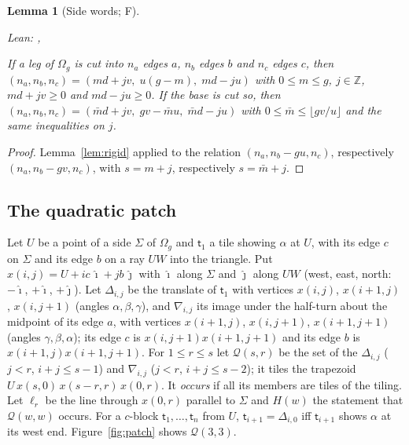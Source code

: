 \documentclass[11pt,reqno]{amsart}
\theoremstyle{plain}
\newtheorem{lemma}[theorem]{Lemma}
\theoremstyle{definition}
\newcommand{\Z}{\mathbb{Z}}
\newcommand{\sF}{\textup{\textsf{F}}}
\begin{document}
\begin{lemma}[Side words; \sF]\label{lem:words}
{\small\noindent\emph{Lean:} , \par}
If a leg of $\Omega_{g}$ is cut into $n_a$ edges $a$, $n_b$ edges $b$ and $n_c$ edges $c$, then $(n_a,n_b,n_c)=(md+jv,\;u(g-m),\;md-ju)$ with $0\le m\le g$, $j\in\Z$, $md+jv\ge0$ and $md-ju\ge0$. If the base is cut so, then $(n_a,n_b,n_c)=(\bar md+jv,\;gv-\bar mu,\;\bar md-ju)$ with $0\le\bar m\le\lfloor gv/u\rfloor$ and the same inequalities on $j$.
\end{lemma}
\begin{proof}
Lemma~\ref{lem:rigid} applied to the relation $(n_a,n_b-gu,n_c)$, respectively $(n_a,n_b-gv,n_c)$, with $s=m+j$, respectively $s=\bar m+j$.
\end{proof}

\subsection{The quadratic patch}\label{sub:patch}
Let $U$ be a point of a side $\Sigma$ of $\Omega_{g}$ and $\mathsf t_1$ a tile showing $\alpha$ at $U$, with its edge $c$ on $\Sigma$ and its edge $b$ on a ray $UW$ into the triangle. Put $x(i,j)=U+ic\,\hat\imath+jb\,\hat\jmath$ with $\hat\imath$ along $\Sigma$ and $\hat\jmath$ along $UW$ (west, east, north: $-\hat\imath$, $+\hat\imath$, $+\hat\jmath$). Let $\Delta_{i,j}$ be the translate of $\mathsf t_1$ with vertices $x(i,j)$, $x(i+1,j)$, $x(i,j+1)$ (angles $\alpha,\beta,\gamma$), and $\nabla_{i,j}$ its image under the half-turn about the midpoint of its edge $a$, with vertices $x(i+1,j)$, $x(i,j+1)$, $x(i+1,j+1)$ (angles $\gamma,\beta,\alpha$); its edge $c$ is $x(i,j+1)x(i+1,j+1)$ and its edge $b$ is $x(i+1,j)x(i+1,j+1)$. For $1\le r\le s$ let $\mathcal Q(s,r)$ be the set of the $\Delta_{i,j}$ ($j<r$, $i+j\le s-1$) and $\nabla_{i,j}$ ($j<r$, $i+j\le s-2$); it tiles the trapezoid $U\,x(s,0)\,x(s-r,r)\,x(0,r)$. It \emph{occurs} if all its members are tiles of the tiling. Let $\ell_r$ be the line through $x(0,r)$ parallel to $\Sigma$ and $H(w)$ the statement that $\mathcal Q(w,w)$ occurs. For a $c$-block $\mathsf t_1,\dots,\mathsf t_n$ from $U$, $\mathsf t_{i+1}=\Delta_{i,0}$ iff $\mathsf t_{i+1}$ shows $\alpha$ at its west end. Figure~\ref{fig:patch} shows $\mathcal Q(3,3)$.
\end{document}
